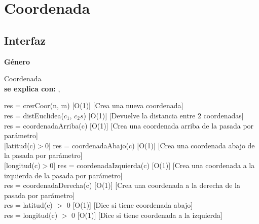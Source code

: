 \section{Coordenada}


\subsection{Interfaz}

\parbox {1,7cm}{{\bf Género}} Coordenada \\
{\bf se explica con:}  , \\
\medskip

{res = crerCoor(n, m)}
[O(1)]
[Crea una nueva coordenada]
\\

{res = distEuclidea($c_1$, $c_2s$)}
[O(1)]
[Devuelve la distancia entre 2 coordenadas]
\\

{res = coordenadaArriba(c)}
[O(1)]
[Crea una coordenada arriba de la pasada por parámetro]
\\

[latitud(c)$>$0]
{res = coordenadaAbajo(c)}
[O(1)]
[Crea una coordenada abajo de la pasada por parámetro]
\\

[longitud(c)$>$0]
{res = coordenadaIzquierda(c)}
[O(1)]
[Crea una coordenada a la izquierda de la pasada por parámetro]
\\

{res = coordenadaDerecha(c)}
[O(1)]
[Crea una coordenada a la derecha de la pasada por parámetro]
\\

{res = latitud(c) $>$ 0}
[O(1)]
[Dice si tiene coordenada abajo]
\\

{res = longitud(c) $>$ 0}
[O(1)]
[Dice si tiene coordenada a la izquierda]
\\

